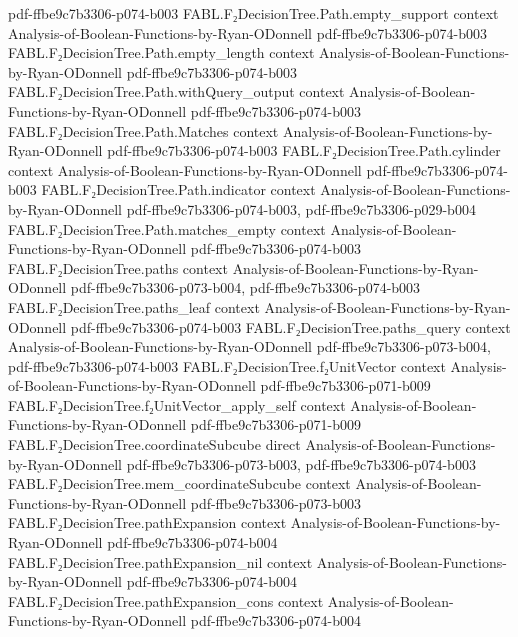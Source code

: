 \begin{theorem}
  {pdf-ffbe9c7b3306-p074-b003}
\proofstep
  {FABL.F₂DecisionTree.Path.empty_support}
  {context}
  {Analysis-of-Boolean-Functions-by-Ryan-ODonnell}
  {pdf-ffbe9c7b3306-p074-b003}
\proofstep
  {FABL.F₂DecisionTree.Path.empty_length}
  {context}
  {Analysis-of-Boolean-Functions-by-Ryan-ODonnell}
  {pdf-ffbe9c7b3306-p074-b003}
\proofstep
  {FABL.F₂DecisionTree.Path.withQuery_output}
  {context}
  {Analysis-of-Boolean-Functions-by-Ryan-ODonnell}
  {pdf-ffbe9c7b3306-p074-b003}
\proofstep
  {FABL.F₂DecisionTree.Path.Matches}
  {context}
  {Analysis-of-Boolean-Functions-by-Ryan-ODonnell}
  {pdf-ffbe9c7b3306-p074-b003}
\proofstep
  {FABL.F₂DecisionTree.Path.cylinder}
  {context}
  {Analysis-of-Boolean-Functions-by-Ryan-ODonnell}
  {pdf-ffbe9c7b3306-p074-b003}
\proofstep
  {FABL.F₂DecisionTree.Path.indicator}
  {context}
  {Analysis-of-Boolean-Functions-by-Ryan-ODonnell}
  {pdf-ffbe9c7b3306-p074-b003,
    pdf-ffbe9c7b3306-p029-b004}
\proofstep
  {FABL.F₂DecisionTree.Path.matches_empty}
  {context}
  {Analysis-of-Boolean-Functions-by-Ryan-ODonnell}
  {pdf-ffbe9c7b3306-p074-b003}
\proofstep
  {FABL.F₂DecisionTree.paths}
  {context}
  {Analysis-of-Boolean-Functions-by-Ryan-ODonnell}
  {pdf-ffbe9c7b3306-p073-b004,
    pdf-ffbe9c7b3306-p074-b003}
\proofstep
  {FABL.F₂DecisionTree.paths_leaf}
  {context}
  {Analysis-of-Boolean-Functions-by-Ryan-ODonnell}
  {pdf-ffbe9c7b3306-p074-b003}
\proofstep
  {FABL.F₂DecisionTree.paths_query}
  {context}
  {Analysis-of-Boolean-Functions-by-Ryan-ODonnell}
  {pdf-ffbe9c7b3306-p073-b004,
    pdf-ffbe9c7b3306-p074-b003}
\proofstep
  {FABL.F₂DecisionTree.f₂UnitVector}
  {context}
  {Analysis-of-Boolean-Functions-by-Ryan-ODonnell}
  {pdf-ffbe9c7b3306-p071-b009}
\proofstep
  {FABL.F₂DecisionTree.f₂UnitVector_apply_self}
  {context}
  {Analysis-of-Boolean-Functions-by-Ryan-ODonnell}
  {pdf-ffbe9c7b3306-p071-b009}
\proofstep
  {FABL.F₂DecisionTree.coordinateSubcube}
  {direct}
  {Analysis-of-Boolean-Functions-by-Ryan-ODonnell}
  {pdf-ffbe9c7b3306-p073-b003,
    pdf-ffbe9c7b3306-p074-b003}
\proofstep
  {FABL.F₂DecisionTree.mem_coordinateSubcube}
  {context}
  {Analysis-of-Boolean-Functions-by-Ryan-ODonnell}
  {pdf-ffbe9c7b3306-p073-b003}
\proofstep
  {FABL.F₂DecisionTree.pathExpansion}
  {context}
  {Analysis-of-Boolean-Functions-by-Ryan-ODonnell}
  {pdf-ffbe9c7b3306-p074-b004}
\proofstep
  {FABL.F₂DecisionTree.pathExpansion_nil}
  {context}
  {Analysis-of-Boolean-Functions-by-Ryan-ODonnell}
  {pdf-ffbe9c7b3306-p074-b004}
\proofstep
  {FABL.F₂DecisionTree.pathExpansion_cons}
  {context}
  {Analysis-of-Boolean-Functions-by-Ryan-ODonnell}
  {pdf-ffbe9c7b3306-p074-b004}

\end{theorem}
